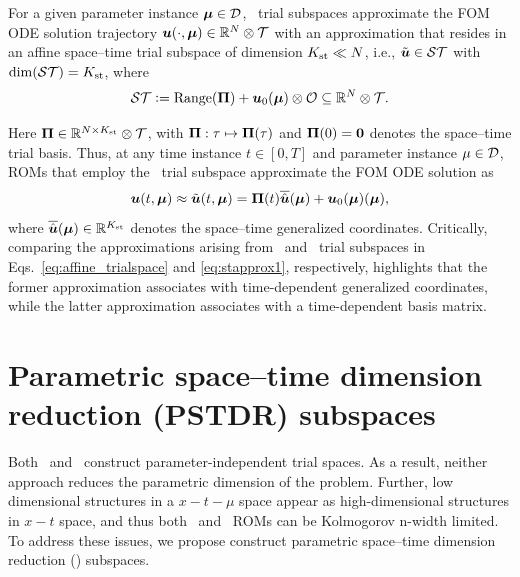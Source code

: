 \documentclass[3p,computermodern,10pt]{elsarticle}
\begin{document}
For a given parameter instance $\boldsymbol \mu \in \mathcal{D}$, \spaceTimeAcronym\ trial subspaces approximate the FOM ODE solution
trajectory
	$\boldsymbol u(\cdot,\boldsymbol \mu) \in\mathbb{R}^{N}\otimes \mathcal{T}$ with an approximation that resides in an
	affine space--time trial subspace of dimension $K_{\text{st}}\ll N$, i.e., 
	$\tilde{\boldsymbol u} \in \mathcal{ST}$ with $\dim(\mathcal{ST}) =K_{\text{st}} $, where
\begin{equation}\label{eq:sttrialspace_def}
 \mathcal{ST} \vcentcolon= 
	\text{Range}(\boldsymbol \Pi) + 
	\boldsymbol u_0(\boldsymbol \mu) \otimes \mathcal{O}
	\subseteq \mathbb{R}^{N} \otimes \mathcal{T}.
\end{equation}

Here $\boldsymbol \Pi \in \mathbb{R}^{N \times K_{\text{st}}} \otimes \mathcal{T}$, with $\boldsymbol \Pi:\tau\mapsto\boldsymbol \Pi(\tau)$ and $\boldsymbol \Pi(0) =
\boldsymbol 0$
denotes the space--time trial basis. 
Thus, at any time instance $t\in[0,T]$ and parameter instance $\mu \in \mathcal{D}$, ROMs that employ the
\spaceTimeAcronym\ trial subspace approximate the FOM ODE solution as
\begin{equation}\label{eq:stapprox1}
 \boldsymbol u(t,\boldsymbol \mu) \approx \tilde{\boldsymbol u}(t,\boldsymbol \mu) = \boldsymbol \Pi(t) \overline{\hat{\boldsymbol u}}(\boldsymbol \mu) + \boldsymbol u_0(\boldsymbol \mu)(\boldsymbol \mu),
\end{equation}
where $ \overline{\hat{\boldsymbol u}}(\boldsymbol \mu) \in \mathbb{R}^{K_{\text{st}}}$ denotes the space--time generalized coordinates. 
Critically, comparing the approximations arising from \spatialAcronym\ and
\spaceTimeAcronym\ trial subspaces in Eqs.~\eqref{eq:affine_trialspace} and \eqref{eq:stapprox1}, respectively,
highlights that the former approximation associates with time-dependent
generalized coordinates, while the latter approximation associates with a
time-dependent basis matrix.





\section{Parametric space--time dimension reduction (PSTDR) subspaces}
Both \spatialAcronym\ and \spaceTimeAcronym\ construct parameter-independent trial spaces. As a result, neither approach reduces the parametric dimension of the problem. Further, low dimensional structures in a $x-t-\mu$ space appear as high-dimensional structures in $x-t$ space, and thus both \spatialAcronym\ and \spaceTimeAcronym\ ROMs can be Kolmogorov n-width limited. To address these issues, we propose construct parametric space--time dimension reduction (\parametricSpaceTimeAcronym) subspaces. 
\end{document}
